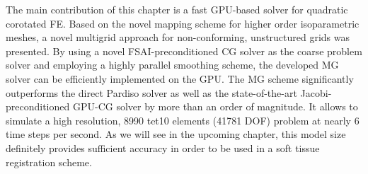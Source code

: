 The main contribution of this chapter is a fast GPU-based solver for quadratic corotated FE. Based on the novel mapping scheme for higher order isoparametric meshes, a novel multigrid approach for non-conforming, unstructured grids was presented. By using a novel FSAI-preconditioned CG solver as the coarse problem solver and employing a highly parallel smoothing scheme, the developed MG solver can be efficiently implemented on the GPU. The MG scheme significantly outperforms the direct Pardiso solver as well as the state-of-the-art Jacobi-preconditioned GPU-CG solver by more than an order of magnitude. It allows to simulate a high resolution, 8990 tet10 elements (41781 DOF) problem at nearly 6 time steps per second. As we will see in the upcoming chapter, this model size definitely provides sufficient accuracy in order to be used in a soft tissue registration scheme.
 


%




